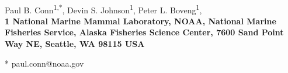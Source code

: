 \documentclass[10pt,letterpaper]{article}
\date{}
\begin{document}
\vspace*{0.35in}

\begin{flushleft}
{\Large
\textbf{}
}
\newline
\\
Paul B. Conn\textsuperscript{1,*},
Devin S. Johnson\textsuperscript{1},
Peter L. Boveng\textsuperscript{1},
\\
\bigskip
\bf{1} National Marine Mammal Laboratory, NOAA, National Marine Fisheries Service,
Alaska Fisheries Science Center, 7600 Sand Point Way NE, Seattle,
WA 98115 USA
\\
\bigskip

* paul.conn@noaa.gov

\end{flushleft}
\end{document}
